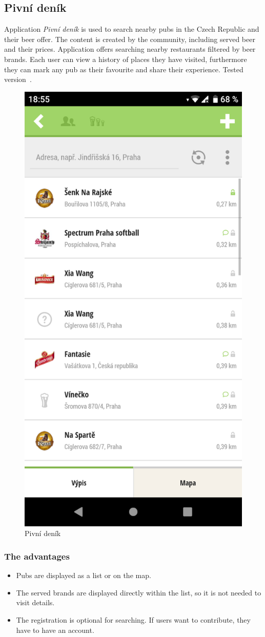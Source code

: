 \subsection{Pivní deník}
Application \textit{Pivní deník} is used to search nearby pubs in the Czech Republic and their beer offer. The content is created by the community, including served beer and their prices.  Application offers searching nearby restaurants filtered by beer brands. Each user can view a history of places they have visited, furthermore they can mark any pub as their favourite and share their experience. Tested version~\cite{app-pivni-denik}.

\begin{figure}[ht]
    \centering
    \includegraphics[width=0.33\linewidth]{img/analysis/pivni_denik.png}
    \caption{Pivní deník}
    \label{fig:pivni-denik}
\end{figure}

\subsubsection{The advantages}
\begin{itemize}
    \item Pubs are displayed as a list or on the map.
    \item The served brands are displayed directly within the list, so it is not needed to visit details.
    \item The registration is optional for searching. If users want to contribute, they have to have an account.
\end{itemize}

